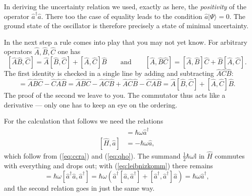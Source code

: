 In deriving the uncertainty relation we used, exactly as here, the \emph{positivity} of the operator $\widehat{a}^\dag \widehat{a}$. There too the case of equality leads to the condition $\widehat{a}|\Psi\rangle = 0$. The ground state of the oscillator is therefore precisely a state of minimal uncertainty.

\begin{greybox}
In the next step a rule comes into play that you may not yet know. For arbitrary operators $\widehat{A}, \widehat{B}, \widehat{C}$ one has
\begin{equation}\label{eq:leibnizkomm}
	[\widehat{A}\widehat{B},\widehat{C}] = \widehat{A}[\widehat{B},\widehat{C}] + [\widehat{A},\widehat{C}]\widehat{B}
	\qquad \text{and} \qquad
	[\widehat{A},\widehat{B}\widehat{C}] = [\widehat{A},\widehat{B}]\widehat{C} + \widehat{B}[\widehat{A},\widehat{C}].
\end{equation}
The first identity is checked in a single line by adding and subtracting $\widehat{A}\widehat{C}\widehat{B}$:
\begin{equation}
	[\widehat{A}\widehat{B},\widehat{C}] = \widehat{A}\widehat{B}\widehat{C} - \widehat{C}\widehat{A}\widehat{B}
	= \widehat{A}\widehat{B}\widehat{C} - \widehat{A}\widehat{C}\widehat{B} + \widehat{A}\widehat{C}\widehat{B} - \widehat{C}\widehat{A}\widehat{B}
	= \widehat{A}[\widehat{B},\widehat{C}] + [\widehat{A},\widehat{C}]\widehat{B}.
\end{equation}
The proof of the second we leave to you. The commutator thus acts like a derivative --- only one has to keep an eye on the ordering.
\end{greybox}

For the calculation that follows we need the relations
\begin{align}
	[\widehat{H},\widehat{a}^\dag] &= \hbar \omega \widehat{a}^\dag \\
	[\widehat{H},\widehat{a}] &= -\hbar \omega \widehat{a}, 
\end{align}
which follow from (\ref{eq:ccra}) and (\ref{eq:qho}). The summand $\tfrac{1}{2}\hbar\omega\mathbb{I}$ in $\widehat{H}$ commutes with everything and drops out; with (\ref{eq:leibnizkomm}) there remains
\begin{equation}
	[\widehat{H},\widehat{a}^\dag] = \hbar\omega[\widehat{a}^\dag\widehat{a},\widehat{a}^\dag]
	= \hbar\omega\left(\widehat{a}^\dag[\widehat{a},\widehat{a}^\dag] + [\widehat{a}^\dag,\widehat{a}^\dag]\widehat{a}\right)
	= \hbar\omega \widehat{a}^\dag,
\end{equation}
and the second relation goes in just the same way.


